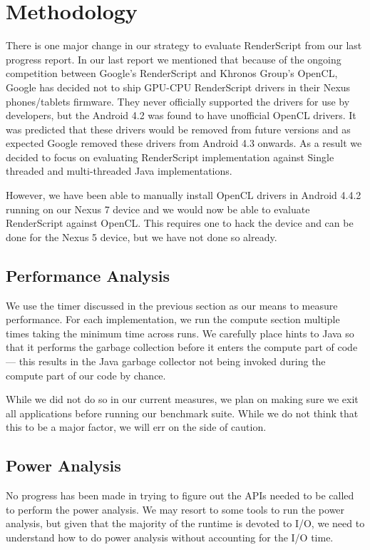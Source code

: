 \section*{Methodology}

There is one major change in our strategy to evaluate RenderScript from our last
progress report. In our last report we mentioned that because of the ongoing competition between
Google's RenderScript and Khronos Group's OpenCL, Google has decided not to ship
GPU-CPU RenderScript drivers in their Nexus phones/tablets firmware. They never
officially supported the drivers for use by developers, but the Android 4.2 was
found to have unofficial OpenCL drivers. It was predicted that these drivers
would be removed from future versions and as expected Google removed these drivers from
Android 4.3 onwards. As a result we decided to focus on evaluating RenderScript
implementation against Single threaded and multi-threaded Java implementations. 

However, we have been able to manually install OpenCL drivers in Android 4.4.2
running on our Nexus 7 device and we would now be able to evaluate
RenderScript against OpenCL.
This requires one to hack the device and can be done for the Nexus 5 device, but
  we have not done so already.


\subsection*{Performance Analysis}

We use the timer discussed in the previous section as our means to measure performance.
For each implementation, we run the compute section multiple times taking the 
  minimum time across runs.
We carefully place hints to Java so that it performs the garbage collection before
  it enters the compute part of code --- this results in the Java garbage collector not being invoked during the compute part of our code by chance.

While we did not do so in our current measures, we plan on making sure
   we exit all applications before running our benchmark suite.
While we do not think that this to be a major factor, we will err on the side of caution.

\subsection*{Power Analysis}

No progress has been made in trying to figure out the APIs needed to be called
  to perform the power analysis.
We may resort to some tools to run the power analysis, but given that the majority
  of the runtime is devoted to I/O, we need to understand how to do power
  analysis without accounting for the I/O time.

